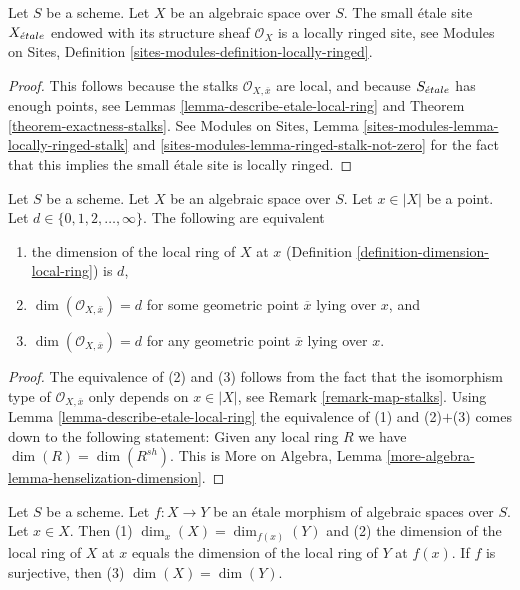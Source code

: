 \begin{lemma}
\label{lemma-etale-site-locally-ringed}
Let $S$ be a scheme.
Let $X$ be an algebraic space over $S$.
The small \'etale site $X_{\acute{e}tale}$ endowed with its
structure sheaf $\mathcal{O}_X$ is a locally ringed site, see
Modules on Sites, Definition \ref{sites-modules-definition-locally-ringed}.
\end{lemma}

\begin{proof}
This follows because the stalks
$\mathcal{O}_{X, \overline{x}}$ are
local, and because $S_{\acute{e}tale}$ has enough points, see
Lemmas \ref{lemma-describe-etale-local-ring} and
Theorem \ref{theorem-exactness-stalks}.
See
Modules on Sites, Lemma \ref{sites-modules-lemma-locally-ringed-stalk} and
\ref{sites-modules-lemma-ringed-stalk-not-zero}
for the fact that this implies the small \'etale site is locally ringed.
\end{proof}

\begin{lemma}
\label{lemma-dimension-local-ring}
Let $S$ be a scheme. Let $X$ be an algebraic space over $S$.
Let $x \in |X|$ be a point. Let $d \in \{0, 1, 2, \ldots, \infty\}$.
The following are equivalent
\begin{enumerate}
\item the dimension of the local ring of $X$ at $x$
(Definition \ref{definition-dimension-local-ring}) is $d$,
\item $\dim(\mathcal{O}_{X, \overline{x}}) = d$ for some geometric
point $\overline{x}$ lying over $x$, and
\item $\dim(\mathcal{O}_{X, \overline{x}}) = d$ for any geometric
point $\overline{x}$ lying over $x$.
\end{enumerate}
\end{lemma}

\begin{proof}
The equivalence of (2) and (3) follows from the fact that the
isomorphism type of $\mathcal{O}_{X, \overline{x}}$ only depends
on $x \in |X|$, see Remark \ref{remark-map-stalks}.
Using Lemma \ref{lemma-describe-etale-local-ring}
the equivalence of (1) and (2)$+$(3) comes down to the
following statement: Given any local ring $R$ we have
$\dim(R) = \dim(R^{sh})$. This is
More on Algebra, Lemma \ref{more-algebra-lemma-henselization-dimension}.
\end{proof}

\begin{lemma}
\label{lemma-dimension-decent-invariant-under-etale}
Let $S$ be a scheme. Let $f : X \to Y$ be an \'etale morphism
of algebraic spaces over $S$. Let $x \in X$. Then
(1) $\dim_x(X) = \dim_{f(x)}(Y)$ and (2) the dimension of
the local ring of $X$ at $x$ equals the dimension of
the local ring of $Y$ at $f(x)$. If $f$ is surjective, then
(3) $\dim(X) = \dim(Y)$.
\end{lemma}

